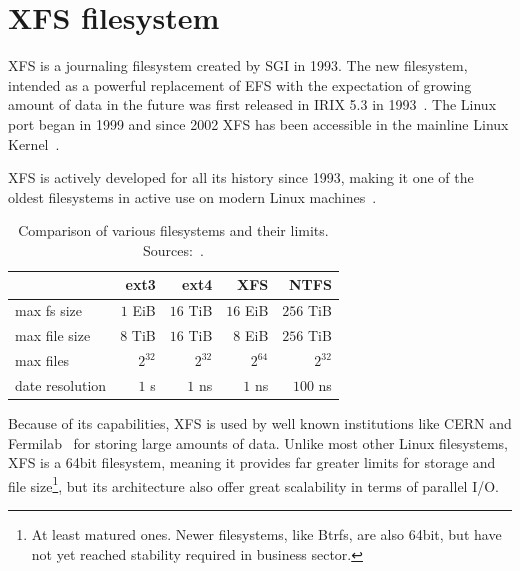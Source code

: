 
\chapter{XFS filesystem} \label{chap:xfs}

XFS is a journaling filesystem created by SGI in 1993. The new filesystem,
intended as a powerful replacement of EFS with the expectation of growing
amount of data in the future was first released in IRIX 5.3 in
1993~\cite{xfsOriginal}. The Linux port began in 1999 and since 2002
XFS has been accessible in the mainline Linux Kernel~\cite[Chap. 1.2,
1.3]{xfsHistory}.

XFS is actively developed for all its history since 1993, making it one of
the oldest filesystems in active use on modern Linux
machines~\cite[40:25]{fsOrigin}.


\begin{table}[h]
\begin{tabular}{|l||r|r|r|r|}
\hline
& ext3 & ext4 & XFS & NTFS \\

\hline
\hline
max fs size & $1$ EiB & $16$ TiB & $16$ EiB& $256$ TiB\\
\hline
max file size & $8$ TiB & $16$ TiB & $8$ EiB & $256$ TiB\\
\hline
max files & $2^{32}$ & $2^{32}$& $2^{64}$ & $2^{32}$\\
\hline
date resolution & $1$ s & $1$ ns & $1$ ns & $100$ ns\\
\hline
\end{tabular}
\caption{Comparison of various filesystems and their limits.
Sources:~\cite{inodesInLinux, NTFS1, NTFS2, NTFSfiletime, XFSforLinux,
RHELfsLimitations}.}
\label{tab:xfs:comparison}
\end{table}



Because of its capabilities, XFS is used by well known institutions
like CERN and Fermilab~\cite{XFSforLinux} for storing large amounts of data.
Unlike most other Linux filesystems, XFS is a 64bit filesystem, meaning it
provides far greater limits for storage and file size\footnote{At least
matured ones. Newer filesystems, like Btrfs, are also 64bit, but have not
yet reached stability required in business sector.}, but its architecture
also offer great scalability in terms of parallel I/O.

